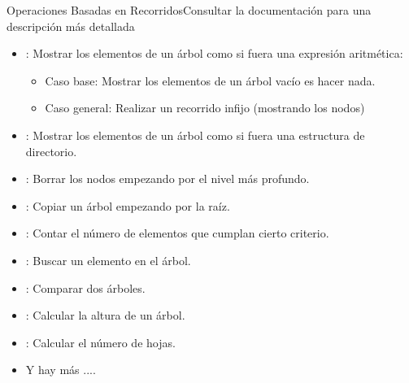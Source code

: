 \documentclass[10pt,envcountsect,spanish]{beamer}
\begin{document}
\begin{frame}{Operaciones Basadas en Recorridos}{Consultar la documentación para una descripción más detallada}


\begin{itemize}
\item {}: Mostrar los elementos de un árbol como si fuera una expresión aritmética:

\begin{itemize}
\item Caso base: Mostrar los elementos de un árbol vacío es  hacer nada.
\item Caso general: Realizar un recorrido infijo (mostrando los nodos)
\end{itemize}

\item  {}:  Mostrar los elementos de un árbol como si fuera una estructura de directorio.

\item  {}:  Borrar los nodos empezando por el nivel más profundo.


\item   {}: Copiar un árbol empezando por la raíz.



\item  {}: Contar el número de elementos que cumplan cierto criterio.



\item {}:  Buscar un elemento en el árbol.

\item {}: Comparar dos árboles.

\item {}:   Calcular la altura de un árbol.

\item  {}: Calcular el número de hojas.

\item Y hay más ....
\end{itemize}
\end{frame}



\end{document}
